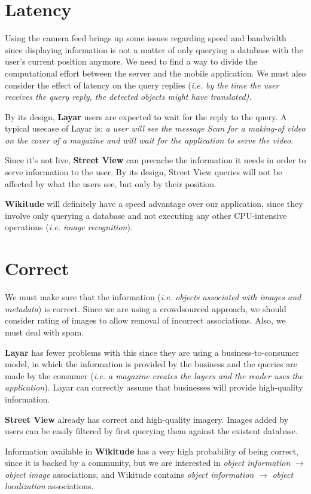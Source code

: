\documentclass[a4paper,onecolumn,oneside,titlepage,11pt]{report}
\begin{document}
\section*{Latency}
Using the camera feed brings up some issues regarding speed and bandwidth since displaying information is not a matter of only querying a database with the user's current position anymore. We need to find a way to divide the computational effort between the server and the mobile application. We must also consider the effect of latency on the query replies (\emph{i.e. by the time the user receives the query reply, the detected objects might have translated).}

By its design, \textbf{Layar} users are expected to wait for the reply to the query. A typical usecase of Layar is: \emph{a user will see the message \emph{Scan for a making-of video} on the cover of a magazine and will wait for the application to serve the video}.

Since it's not live, \textbf{Street View} can precache the information it needs in order to serve information to the user. By its design, Street View queries will not be affected by what the users see, but only by their position.

\textbf{Wikitude} will definitely have a speed advantage over our application, since they involve only querying a database and not executing any other CPU-intensive operations (\emph{i.e. image recognition}).

\section*{Correct}
We must make sure that the information (\emph{i.e. objects associated with images and metadata}) is correct. Since we are using a crowdsourced approach, we should consider rating of images to allow removal of incorrect associations. Also, we must deal with spam.

\textbf{Layar} has fewer problems with this since they are using a business-to-consumer model, in which the information is provided by the business and the queries are made by the consumer (\emph{i.e. a magazine creates the layers and the reader uses the application}). Layar can correctly assume that businesses will provide high-quality information.

\textbf{Street View} already has correct and high-quality imagery. Images added by users can be easily filtered by first querying them against the existent database.

Information available in \textbf{Wikitude} has a very high probability of being correct, since it is backed by a community, but we are interested in \emph{object information} $\rightarrow$ \emph{object image} associations, and Wikitude contains \emph{object information} $\rightarrow$ \emph{object localization} associations.
\end{document}
